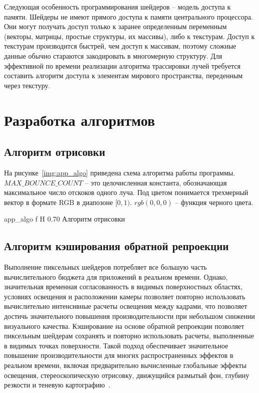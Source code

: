 Следующая особенность программирования шейдеров -- модель доступа к памяти. 
Шейдеры не имеют прямого доступа к памяти центрального процессора. Они могут
получать доступ только к заранее определенным переменным (векторы, матрицы,
простые структуры, их массивы), либо к текстурам. Доступ к текстурам производится
быстрей, чем доступ к массивам, поэтому сложные данные обычно стараются 
закодировать в многомерную структуру. Для эффективной по времени реализации
алгоритма трассировки лучей требуется составить алгоритм доступа к элементам
мирового пространства, переденным через текстуру. 

\section{Разработка алгоритмов}

\subsection{Алгоритм отрисовки}

На рисунке~\ref{img:app_algo} приведена схема алгоритма работы программы.
$MAX\_BOUNCE\_COUNT$ -- это целочисленная константа, обозначающая максимальное число
отскоков одного луча. Под цветом понимается
трехмерный вектор в формате RGB в диапозоне $[0, 1)$. $rgb(0,0,0)$ -- функция черного цвета. 

    {app_algo}
    {f}
    {H}
    {0.70\textwidth}
    {Алгоритм отрисовки}

\subsection{Алгоритм кэширования обратной репроекции}
Выполнение пиксельных шейдеров потребляет все большую часть вычислительного бюджета для приложений в 
реальном времени. Однако, значительная временная согласованность в видимых поверхностных областях, 
условиях освещения и расположении камеры позволяет повторно использовать вычислительно интенсивные 
расчеты освещения между кадрами, что позволяет достичь значительного повышения производительности 
при небольшом снижении визуального качества. 
Кэширование на основе обратной репроекции позволяет пиксельным шейдерам сохранять и повторно использовать 
расчеты, выполненные в видимых точках поверхности. 
Такой подход обеспечивает значительное повышение производительности для многих распространенных 
эффектов в реальном времени, включая предварительно вычисленные глобальные эффекты освещения, 
стереоскопическую отрисовку, движущийся размытый фон, глубину резкости и теневую картографию~\cite{ARTSwRPC}.

